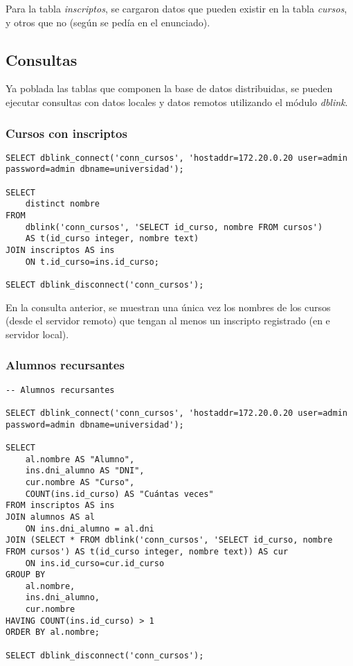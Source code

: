 Para la tabla \emph{inscriptos}, se cargaron datos que pueden existir en la tabla \emph{cursos}, y otros que no (según se pedía en el enunciado).  

\subsection{Consultas}

Ya poblada las tablas que componen la base de datos distribuidas, se pueden ejecutar consultas con datos locales y datos remotos utilizando el módulo \emph{dblink}. 

\subsubsection{Cursos con inscriptos}


\vspace*{5mm}
\begin{lstlisting}[title=Cursos con algún inscripto (el script es \emph{cursos\_con\_inscriptos.sql})]
SELECT dblink_connect('conn_cursos', 'hostaddr=172.20.0.20 user=admin password=admin dbname=universidad');

SELECT 
    distinct nombre 
FROM 
    dblink('conn_cursos', 'SELECT id_curso, nombre FROM cursos') 
    AS t(id_curso integer, nombre text)
JOIN inscriptos AS ins 
    ON t.id_curso=ins.id_curso;

SELECT dblink_disconnect('conn_cursos');
\end{lstlisting}

En la consulta anterior, se muestran una única vez los nombres de los cursos (desde el servidor remoto) que tengan al menos un inscripto registrado (en e servidor local).


\subsubsection{Alumnos recursantes}

\vspace*{5mm}
\begin{lstlisting}[title=Alumnos que cursaron más de una vez una materia (el script es \emph{recursantes.sql})]
-- Alumnos recursantes

SELECT dblink_connect('conn_cursos', 'hostaddr=172.20.0.20 user=admin password=admin dbname=universidad');

SELECT 
    al.nombre AS "Alumno",
    ins.dni_alumno AS "DNI", 
    cur.nombre AS "Curso",
    COUNT(ins.id_curso) AS "Cuántas veces" 
FROM inscriptos AS ins
JOIN alumnos AS al
    ON ins.dni_alumno = al.dni
JOIN (SELECT * FROM dblink('conn_cursos', 'SELECT id_curso, nombre FROM cursos') AS t(id_curso integer, nombre text)) AS cur
    ON ins.id_curso=cur.id_curso
GROUP BY 
    al.nombre,
    ins.dni_alumno,
    cur.nombre
HAVING COUNT(ins.id_curso) > 1 
ORDER BY al.nombre;

SELECT dblink_disconnect('conn_cursos');
\end{lstlisting}

